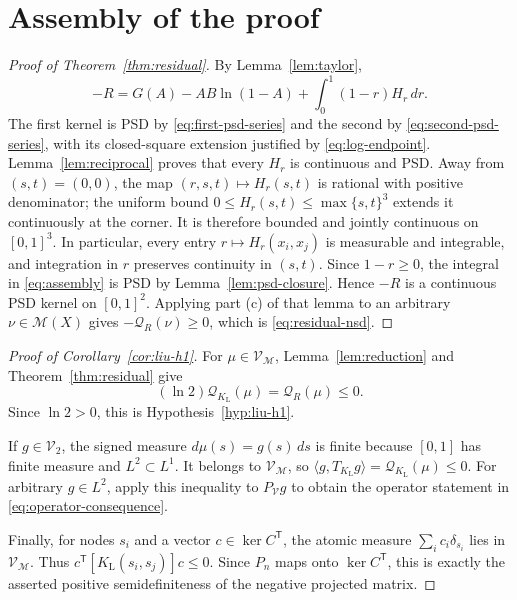 \documentclass[11pt]{article}
\theoremstyle{plain}
\theoremstyle{definition}
\theoremstyle{remark}
\newcommand{\M}{\mathcal M}
\newcommand{\V}{\mathcal V}
\newcommand{\QF}{\mathcal Q}
\begin{document}
\section{Assembly of the proof}
\label{sec:assembly}

\begin{proof}[Proof of Theorem~\ref{thm:residual}]
By Lemma~\ref{lem:taylor},
\begin{equation}
  -R=G(A)-AB\ln(1-A)+\int_0^1(1-r)H_r\,dr.
  \label{eq:assembly}
\end{equation}
The first kernel is PSD by \eqref{eq:first-psd-series} and the second by
\eqref{eq:second-psd-series}, with its closed-square extension justified by
\eqref{eq:log-endpoint}.  Lemma~\ref{lem:reciprocal} proves that every \(H_r\)
is continuous and PSD.  Away from \((s,t)=(0,0)\), the map
\((r,s,t)\mapsto H_r(s,t)\) is rational with positive denominator; the uniform
bound \(0\le H_r(s,t)\le\max\{s,t\}^3\) extends it continuously at the corner.
It is therefore bounded and jointly continuous on \([0,1]^3\).  In particular,
every entry \(r\mapsto H_r(x_i,x_j)\) is measurable and integrable, and
integration in \(r\) preserves continuity in \((s,t)\).  Since \(1-r\ge0\),
the integral in \eqref{eq:assembly} is PSD by
Lemma~\ref{lem:psd-closure}.  Hence \(-R\) is a continuous PSD kernel on
\([0,1]^2\).  Applying part (c) of that
lemma to an arbitrary \(\nu\in\M(X)\) gives
\(-\QF_R(\nu)\ge0\), which is \eqref{eq:residual-nsd}.
\end{proof}

\begin{proof}[Proof of Corollary~\ref{cor:liu-h1}]
For \(\mu\in\V_{\M}\), Lemma~\ref{lem:reduction} and
Theorem~\ref{thm:residual} give
\[
  (\ln2)\QF_{K_{\mathrm L}}(\mu)=\QF_R(\mu)\le0.
\]
Since \(\ln2>0\), this is Hypothesis~\ref{hyp:liu-h1}.

If \(g\in\V_2\), the signed measure \(d\mu(s)=g(s)\,ds\) is finite because
\([0,1]\) has finite measure and \(L^2\subset L^1\).  It belongs to
\(\V_{\M}\), so
\(\langle g,T_{K_{\mathrm L}}g\rangle=\QF_{K_{\mathrm L}}(\mu)\le0\).
For arbitrary \(g\in L^2\), apply this inequality to \(P_{\V}g\) to obtain
the operator statement in \eqref{eq:operator-consequence}.

Finally, for nodes \(s_i\) and a vector \(c\in\ker C^{\mathsf T}\), the atomic
measure \(\sum_i c_i\delta_{s_i}\) lies in \(\V_{\M}\).  Thus
\(c^{\mathsf T}[K_{\mathrm L}(s_i,s_j)]c\le0\).  Since \(P_n\) maps onto
\(\ker C^{\mathsf T}\), this is exactly the asserted positive
semidefiniteness of the negative projected matrix.
\end{proof}
\end{document}
